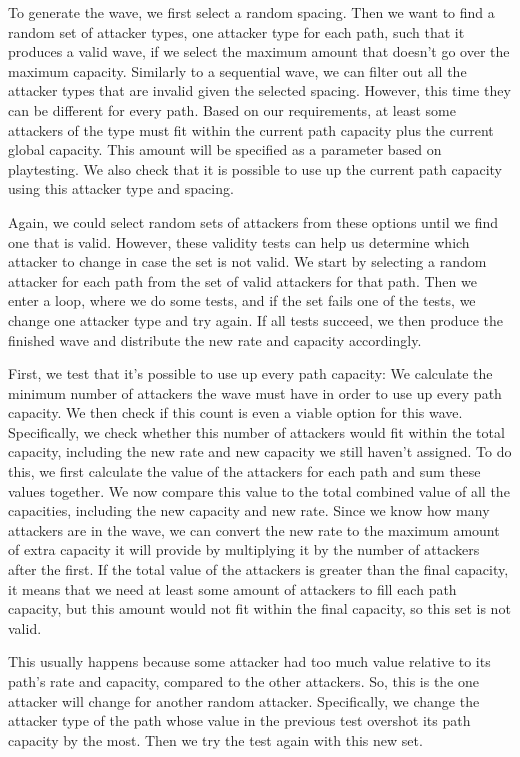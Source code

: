 To generate the wave, we first select a random spacing.
Then we want to find a random set of attacker types, one attacker type for each path, such that it produces a valid wave, if we select the maximum amount that doesn't go over the maximum capacity.
Similarly to a sequential wave, we can filter out all the attacker types that are invalid given the selected spacing.
However, this time they can be different for every path.
Based on our requirements, at least some attackers of the type must fit within the current path capacity plus the current global capacity.
This amount will be specified as a parameter based on playtesting.
We also check that it is possible to use up the current path capacity using this attacker type and spacing.

Again, we could select random sets of attackers from these options until we find one that is valid.
However, these validity tests can help us determine which attacker to change in case the set is not valid.
We start by selecting a random attacker for each path from the set of valid attackers for that path.
Then we enter a loop, where we do some tests, and if the set fails one of the tests, we change one attacker type and try again.
If all tests succeed, we then produce the finished wave and distribute the new rate and capacity accordingly.

First, we test that it's possible to use up every path capacity:
We calculate the minimum number of attackers the wave must have in order to use up every path capacity.
We then check if this count is even a viable option for this wave.
Specifically, we check whether this number of attackers would fit within the total capacity, including the new rate and new capacity we still haven't assigned.
To do this, we first calculate the value of the attackers for each path and sum these values together.
We now compare this value to the total combined value of all the capacities, including the new capacity and new rate.
Since we know how many attackers are in the wave, we can convert the new rate to the maximum amount of extra capacity it will provide by multiplying it by the number of attackers after the first.
If the total value of the attackers is greater than the final capacity, it means that we need at least some amount of attackers to fill each path capacity, but this amount would not fit within the final capacity, so this set is not valid.

This usually happens because some attacker had too much value relative to its path's rate and capacity, compared to the other attackers.
So, this is the one attacker will change for another random attacker.
Specifically, we change the attacker type of the path whose value in the previous test overshot its path capacity by the most.
Then we try the test again with this new set.


